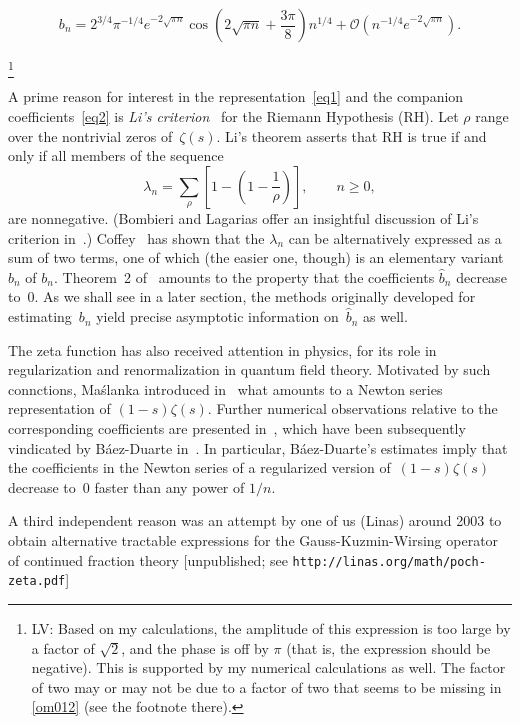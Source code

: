 \documentclass{amsart}
\def\hat{\widehat}
\begin{document}
\begin{equation}\label{asympform}
b_n =2^{3/4}\pi^{-1/4}e^{-2\sqrt{\pi n}}\cos\left(2\sqrt{\pi n}+\frac{3\pi}{8}\right)n^{1/4}
+\mathcal{O}\left(n^{-1/4} e^{-2\sqrt{\pi n}}\right).
\end{equation}

\footnote{
LV: Based on my calculations, the amplitude of this expression is too 
large by a factor of $\sqrt{2}$, and the phase is off by $\pi$ (that is, 
the expression should be negative).  This is supported by my numerical 
calculations as well. The factor of two may or may not be due to a factor
of two that seems to be missing in \eqref{om012} (see the footnote there).
}

A prime reason for  interest in the representation~\eqref{eq1} and the
companion           coefficients~\eqref{eq2}         is     \emph{Li's
criterion}~\cite{Li97} for the   Riemann Hypothesis (RH).   Let $\rho$
range over the  nontrivial zeros of~$\zeta(s)$.   Li's theorem asserts
that RH is true if and only if all members of the sequence
\[
\lambda_n=\sum_\rho \left[1-\left(1-\frac{1}{\rho}\right)\right], \qquad n\ge0,
\]
are nonnegative. (Bombieri and Lagarias
 offer an insightful discussion of Li's criterion in~\cite{BoLa99}.) 
Coffey~\cite{Coffey05} has shown that the $\lambda_n$
can be alternatively  expressed as a  sum of  two terms, one  of which
(the easier one, though) is an elementary variant $\hat b_n$ of $b_n$.
Theorem~2 of~\cite{Coffey05}  amounts to the property that the coefficients $\hat b_n$ 
decrease to~0. As we shall see in a later section, 
the methods originally developed for estimating~$b_n$
yield precise asymptotic information on~$\hat b_n$ as well.

The zeta function has also received attention in physics,
for its role in regularization and renormalization in 
quantum field theory. 
Motivated by such connctions, 
Ma\'slanka introduced in~\cite{Maslanka01} 
what amounts to a Newton series representation of $(1-s)\zeta(s)$.
Further numerical observations relative to the corresponding coefficients
are presented in~\cite{Maslanka04}, which
have been subsequently vindicated by B\'aez-Duarte in~\cite{Baez03}.
In particular, B\'aez-Duarte's estimates imply that the coefficients
in the Newton series of a regularized version of~$(1-s)\zeta(s)$ decrease to~0
faster than any power of $1/n$.

A third independent reason was an attempt by one of us (Linas) around 2003 to obtain
alternative tractable expressions for the Gauss-Kuzmin-Wirsing operator of 
continued fraction theory [unpublished; see
\verb|http://linas.org/math/poch-zeta.pdf|]
\end{document}
